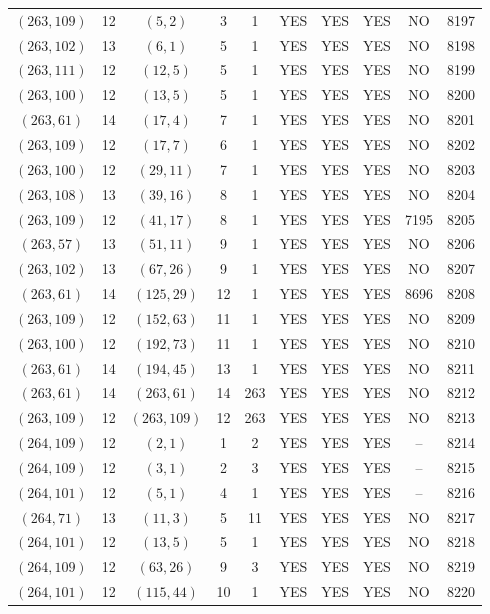 \begin{longtable}{|c|c|c|c|c|c|c|c|c|c|}
$(263, 109)$ & 12 & $(5, 2)$ & 3 & 1 & YES & YES & YES & NO & 8197\\
$(263, 102)$ & 13 & $(6, 1)$ & 5 & 1 & YES & YES & YES & NO & 8198\\
$(263, 111)$ & 12 & $(12, 5)$ & 5 & 1 & YES & YES & YES & NO & 8199\\
$(263, 100)$ & 12 & $(13, 5)$ & 5 & 1 & YES & YES & YES & NO & 8200\\
$(263, 61)$ & 14 & $(17, 4)$ & 7 & 1 & YES & YES & YES & NO & 8201\\
$(263, 109)$ & 12 & $(17, 7)$ & 6 & 1 & YES & YES & YES & NO & 8202\\
$(263, 100)$ & 12 & $(29, 11)$ & 7 & 1 & YES & YES & YES & NO & 8203\\
$(263, 108)$ & 13 & $(39, 16)$ & 8 & 1 & YES & YES & YES & NO & 8204\\
$(263, 109)$ & 12 & $(41, 17)$ & 8 & 1 & YES & YES & YES & 7195 & 8205\\
$(263, 57)$ & 13 & $(51, 11)$ & 9 & 1 & YES & YES & YES & NO & 8206\\
$(263, 102)$ & 13 & $(67, 26)$ & 9 & 1 & YES & YES & YES & NO & 8207\\
$(263, 61)$ & 14 & $(125, 29)$ & 12 & 1 & YES & YES & YES & 8696 & 8208\\
$(263, 109)$ & 12 & $(152, 63)$ & 11 & 1 & YES & YES & YES & NO & 8209\\
$(263, 100)$ & 12 & $(192, 73)$ & 11 & 1 & YES & YES & YES & NO & 8210\\
$(263, 61)$ & 14 & $(194, 45)$ & 13 & 1 & YES & YES & YES & NO & 8211\\
$(263, 61)$ & 14 & $(263, 61)$ & 14 & 263 & YES & YES & YES & NO & 8212\\
$(263, 109)$ & 12 & $(263, 109)$ & 12 & 263 & YES & YES & YES & NO & 8213\\
$(264, 109)$ & 12 & $(2, 1)$ & 1 & 2 & YES & YES & YES & -- & 8214\\
$(264, 109)$ & 12 & $(3, 1)$ & 2 & 3 & YES & YES & YES & -- & 8215\\
$(264, 101)$ & 12 & $(5, 1)$ & 4 & 1 & YES & YES & YES & -- & 8216\\
$(264, 71)$ & 13 & $(11, 3)$ & 5 & 11 & YES & YES & YES & NO & 8217\\
$(264, 101)$ & 12 & $(13, 5)$ & 5 & 1 & YES & YES & YES & NO & 8218\\
$(264, 109)$ & 12 & $(63, 26)$ & 9 & 3 & YES & YES & YES & NO & 8219\\
$(264, 101)$ & 12 & $(115, 44)$ & 10 & 1 & YES & YES & YES & NO & 8220\\

\end{longtable}

